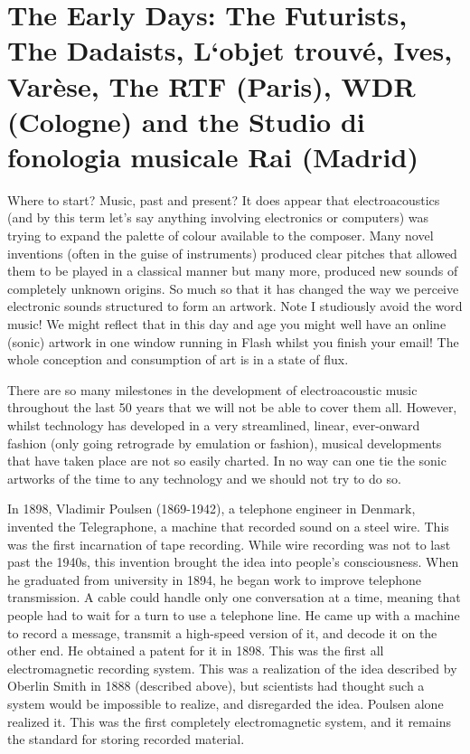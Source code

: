 \section{The Early Days: The Futurists, The Dadaists, L`objet trouv\'e, Ives, Var\`ese, The RTF (Paris), WDR (Cologne) and the Studio di fonologia musicale Rai (Madrid)}

Where to start? Music, past and present? It does appear that electroacoustics (and by this term let's say anything involving electronics or computers) was trying to expand the palette of colour available to the composer. Many novel inventions (often in the guise of instruments) produced clear pitches that allowed them to be played in a classical manner but many more, produced new sounds of completely unknown origins. So much so that it has changed the way we perceive electronic sounds structured to form an artwork. Note I studiously avoid the word music! We might reflect that in this day and age you might well have an online (sonic) artwork in one window running in Flash whilst you finish your email! The whole conception and consumption of art is in a state of flux.

There are so many milestones in the development of electroacoustic music throughout the last 50 years that we will not be able to cover them all. However, whilst technology has developed in a very streamlined, linear, ever-onward fashion (only going retrograde by emulation or fashion), musical developments that have taken place are not so easily charted. In no way can one tie the sonic artworks of the time to any technology and we should not try to do so.

In 1898, Vladimir Poulsen (1869-1942), a telephone engineer in Denmark, invented the Telegraphone, a machine that recorded sound on a steel wire. This was the first incarnation of tape recording. While wire recording was not to last past the 1940s, this invention brought the idea into people's consciousness. When he graduated from university in 1894, he began work to improve telephone transmission. A cable could handle only one conversation at a time, meaning that people had to wait for a turn to use a telephone line. He came up with a machine to record a message, transmit a high-speed version of it, and decode it on the other end. He obtained a patent for it in 1898. This was the first all electromagnetic recording system. This was a realization of the idea described by Oberlin Smith in 1888 (described above), but scientists had thought such a system would be impossible to realize, and disregarded the idea. Poulsen alone realized it. This was the first completely electromagnetic system, and it remains the standard for storing recorded material.

